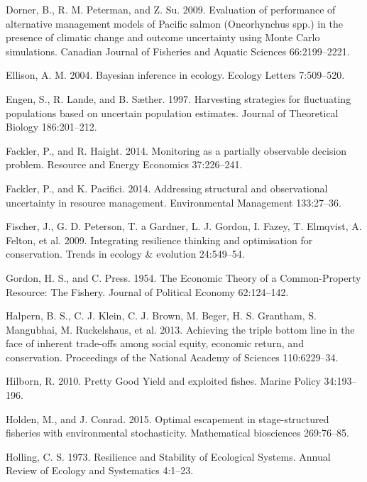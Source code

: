 \documentclass[3p]{elsarticle} %
\begin{document}
\leavevmode\hypertarget{ref-Dorner2009}{}%
Dorner, B., R. M. Peterman, and Z. Su. 2009. Evaluation of performance
of alternative management models of Pacific salmon (Oncorhynchus spp.)
in the presence of climatic change and outcome uncertainty using Monte
Carlo simulations. Canadian Journal of Fisheries and Aquatic Sciences
66:2199--2221.

\leavevmode\hypertarget{ref-Ellison2004}{}%
Ellison, A. M. 2004. Bayesian inference in ecology. Ecology Letters
7:509--520.

\leavevmode\hypertarget{ref-Engen1997}{}%
Engen, S., R. Lande, and B. Sæther. 1997. Harvesting strategies for
fluctuating populations based on uncertain population estimates. Journal
of Theoretical Biology 186:201--212.

\leavevmode\hypertarget{ref-Fackler2014b}{}%
Fackler, P., and R. Haight. 2014. Monitoring as a partially observable
decision problem. Resource and Energy Economics 37:226--241.

\leavevmode\hypertarget{ref-Fackler2014}{}%
Fackler, P., and K. Pacifici. 2014. Addressing structural and
observational uncertainty in resource management. Environmental
Management 133:27--36.

\leavevmode\hypertarget{ref-Fischer2009}{}%
Fischer, J., G. D. Peterson, T. a Gardner, L. J. Gordon, I. Fazey, T.
Elmqvist, A. Felton, et al. 2009. Integrating resilience thinking and
optimisation for conservation. Trends in ecology \& evolution
24:549--54.

\leavevmode\hypertarget{ref-Gordon1954}{}%
Gordon, H. S., and C. Press. 1954. The Economic Theory of a
Common-Property Resource: The Fishery. Journal of Political Economy
62:124--142.

\leavevmode\hypertarget{ref-Halpern2013}{}%
Halpern, B. S., C. J. Klein, C. J. Brown, M. Beger, H. S. Grantham, S.
Mangubhai, M. Ruckelshaus, et al. 2013. Achieving the triple bottom line
in the face of inherent trade-offs among social equity, economic return,
and conservation. Proceedings of the National Academy of Sciences
110:6229--34.

\leavevmode\hypertarget{ref-Hilborn2010}{}%
Hilborn, R. 2010. Pretty Good Yield and exploited fishes. Marine Policy
34:193--196.

\leavevmode\hypertarget{ref-Holden2015}{}%
Holden, M., and J. Conrad. 2015. Optimal escapement in stage-structured
fisheries with environmental stochasticity. Mathematical biosciences
269:76--85.

\leavevmode\hypertarget{ref-Holling1973}{}%
Holling, C. S. 1973. Resilience and Stability of Ecological Systems.
Annual Review of Ecology and Systematics 4:1--23.
\end{document}

